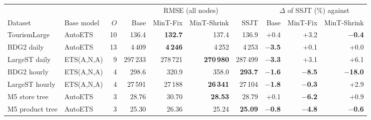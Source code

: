 \footnotesize\setlength{\tabcolsep}{4pt}
\begin{tabular}{l l r rrrr rrr}
\toprule
 & & & \multicolumn{4}{c}{RMSE (all nodes)} & \multicolumn{3}{c}{$\Delta$ of SSJT (\%) against}\\
\cmidrule(lr){4-7}\cmidrule(lr){8-10}
Dataset & Base model & $O$ & Base & MinT-Fix & MinT-Shrink & SSJT & Base & MinT-Fix & MinT-Shrink\\
\midrule
TourismLarge & AutoETS & 10 & 136.4 & \textbf{132.7} & 137.4 & 136.9 & +0.4 & +3.2 & \textbf{$-$0.4}\\
BDG2 daily & AutoETS & 13 & 4\,409 & \textbf{4\,246} & 4\,252 & 4\,253 & \textbf{$-$3.5} & +0.1 & +0.0\\
LargeST daily & ETS(A,N,A) & 9 & 297\,233 & 278\,721 & \textbf{270\,980} & 287\,499 & \textbf{$-$3.3} & +3.1 & +6.1\\
BDG2 hourly & ETS(A,N,A) & 4 & 298.6 & 320.9 & 358.0 & \textbf{293.7} & \textbf{$-$1.6} & \textbf{$-$8.5} & \textbf{$-$18.0}\\
LargeST hourly & ETS(A,N,A) & 4 & 27\,591 & 27\,188 & \textbf{26\,341} & 27\,104 & \textbf{$-$1.8} & \textbf{$-$0.3} & +2.9\\
M5 store tree & AutoETS & 3 & 28.76 & 30.70 & \textbf{28.53} & 28.79 & +0.1 & \textbf{$-$6.2} & +0.9\\
M5 product tree & AutoETS & 3 & 25.30 & 26.36 & 25.24 & \textbf{25.09} & \textbf{$-$0.8} & \textbf{$-$4.8} & \textbf{$-$0.6}\\
\bottomrule
\end{tabular}
